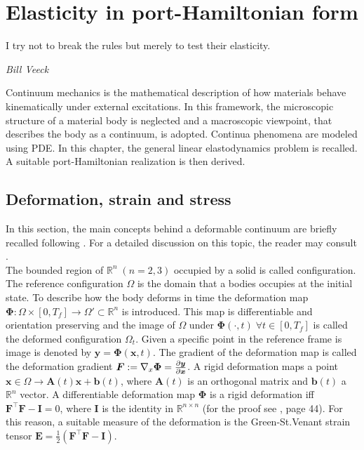 \chapter{Elasticity in port-Hamiltonian form}

\epigraph{I try not to break the rules but merely to test their elasticity.}{\textit{Bill Veeck}}
\minitoc

Continuum mechanics is the mathematical description of how materials behave kinematically under external excitations. In this framework, the microscopic structure of a material body is neglected and a macroscopic viewpoint, that describes the body as a continuum, is adopted. Continua phenomena are modeled using PDE. In this chapter, the general linear elastodynamics problem is recalled. A suitable port-Hamiltonian realization is then derived.

\section{Deformation, strain and stress}
In this section, the main concepts behind a deformable continuum are briefly recalled following \cite{lee2012mixed}. For a detailed discussion on this topic, the reader may consult \cite{abeyaratne2012notes,landau2012elasticity}. \\

The bounded region of $\mathbb{R}^n \; (n=2, 3)$ occupied by a solid is called configuration. The reference configuration $\Omega$ is the domain that a bodies occupies at the initial state. To describe how the body deforms in time the deformation map $\bm\Phi: \Omega \times [0, T_f] \rightarrow \Omega' \subset \mathbb{R}^n$ is introduced. This map is differentiable and orientation preserving and the image of $\Omega$ under $\bm\Phi(\cdot, t) \; \forall t \in [0, T_f]$ is called the deformed configuration $\Omega_t$. Given a specific point in the reference frame is image is denoted by $\bm{y} = \bm{\Phi}(\bm{x}, t)$. The gradient of the deformation map is called the deformation gradient $\bm{F}:=\nabla_x\bm{\Phi} = \diffp{\bm{y}}{\bm{x}}$. A rigid deformation maps a point $\bm{x} \in \Omega \rightarrow \bm{A}(t) \bm{x} + \bm{b}(t)$, where $\bm{A}(t)$ is an orthogonal matrix and $\bm{b}(t)$ a $\mathbb{R}^n$ vector. A differentiable deformation map $\bm\Phi$ is a rigid deformation iff $\bm{F}^\top \bm{F} - \bm{I} = 0$,  where $\bm{I}$ is the identity in $\mathbb{R}^{n\times n}$ (for the proof see \cite{ciarlet1988mathematical}, page 44). For this reason, a suitable measure of the deformation is the Green-St.Venant strain tensor $\bm{E} = \frac{1}{2} (\bm{F}^\top \bm{F} - \bm{I})$.  \\

